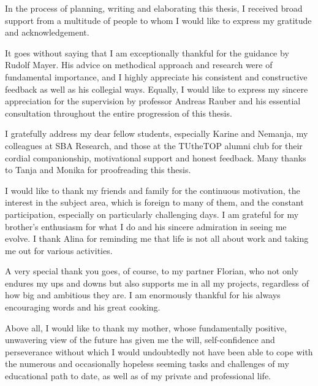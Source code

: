 \documentclass[draft,final]{vutinfth} %
\begin{document}
\frontmatter %

\addstatementpage


\begin{acknowledgements*}
In the process of planning, writing and elaborating this thesis, I received broad support from a multitude of people to whom I would like to express my gratitude and acknowledgement.

It goes without saying that I am exceptionally thankful for the guidance by Rudolf Mayer. His advice on methodical approach and research were of fundamental importance, and I highly appreciate his consistent and constructive feedback as well as his collegial ways. Equally, I would like to express my sincere appreciation for the supervision by professor Andreas Rauber and his essential consultation throughout the entire progression of this thesis.

I gratefully address my dear fellow students, especially Karine and Nemanja, my colleagues at SBA Research, and those at the TUtheTOP alumni club for their cordial companionship, motivational support and honest feedback. Many thanks to Tanja and Monika for proofreading this thesis.

I would like to thank my friends and family for the continuous motivation, the interest in the subject area, which is foreign to many of them, and the constant participation, especially on particularly challenging days. I am grateful for my brother’s enthusiasm for what I do and his sincere admiration in seeing me evolve. I thank Alina for reminding me that life is not all about work and taking me out for various activities.

A very special thank you goes, of course, to my partner Florian, who not only endures my ups and downs but also supports me in all my projects, regardless of how big and ambitious they are. I am enormously thankful for his always encouraging words and his great cooking.

Above all, I would like to thank my mother, whose fundamentally positive, unwavering view of the future has given me the will, self-confidence and perseverance without which I would undoubtedly not have been able to cope with the numerous and occasionally hopeless seeming tasks and challenges of my educational path to date, as well as of my private and professional life.
\end{acknowledgements*}
\end{document}
